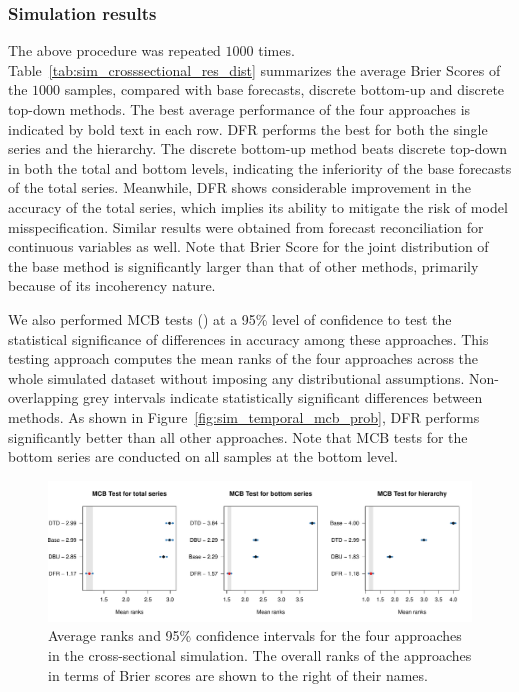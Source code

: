 \documentclass[a4paper,review,12pt,authoryear]{elsarticle}
\begin{document}
    \subsubsection{Simulation results}
    The above procedure was repeated $1000$ times.
    Table~\ref{tab:sim_crosssectional_res_dist} summarizes the average Brier Scores of the $1000$ samples, compared with base forecasts, discrete bottom-up and discrete top-down methods.
    The best average performance of the four approaches is indicated by bold text in each row.
    DFR performs the best for both the single series and the hierarchy.
    The discrete bottom-up method beats discrete top-down in both the total and bottom levels, indicating the inferiority of the base forecasts of the total series.
    Meanwhile, DFR shows considerable improvement in the accuracy of the total series, which implies its ability to mitigate the risk of model misspecification.
    Similar results were obtained from forecast reconciliation for continuous variables as well.
    Note that Brier Score for the joint distribution of the base method is significantly larger than that of other methods, primarily because of its incoherency nature.

    We also performed MCB tests (\citealp{koningM3CompetitionStatistical2005}) at a 95\% level of confidence to test the statistical significance of differences in accuracy among these approaches.
    This testing approach computes the mean ranks of the four approaches across the whole simulated dataset without imposing any distributional assumptions.
    Non-overlapping grey intervals indicate statistically significant differences between methods.
    As shown in Figure~\ref{fig:sim_temporal_mcb_prob}, DFR performs significantly better than all other approaches.
    Note that MCB tests for the bottom series are conducted on all samples at the bottom level.

    \begin{figure}
      \centering
      \label{fig:mcb_crosssectional}
      \caption{Average ranks and 95\% confidence intervals for the four approaches in the cross-sectional simulation. The overall ranks of the approaches in terms of Brier scores are shown to the right of their names.}
      \includegraphics[width=\textwidth]{figures/cross_sectional_mcb.pdf}
    \end{figure}
\end{document}
